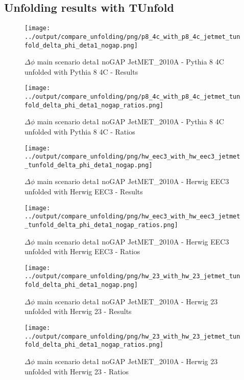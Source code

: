 \documentclass[11pt]{book}
\begin{document}
\clearpage
\subsection{Unfolding results with TUnfold}

\begin{figure}[ht]
\centering
\texttt{[image: ../output/compare\_unfolding/png/p8\_4c\_with\_p8\_4c\_jetmet\_tunfold\_delta\_phi\_deta1\_nogap.png]}
\caption{$\Delta\phi$ main scenario deta1 noGAP JetMET\_2010A - Pythia 8 4C unfolded with Pythia 8 4C - Results}
\label{p8_p8_jetmet_tunfold_delta_phi_deta1_nogap_a}
\end{figure}

\begin{figure}[ht]
\centering
\texttt{[image: ../output/compare\_unfolding/png/p8\_4c\_with\_p8\_4c\_jetmet\_tunfold\_delta\_phi\_deta1\_nogap\_ratios.png]}
\caption{$\Delta\phi$ main scenario deta1 noGAP JetMET\_2010A - Pythia 8 4C unfolded with Pythia 8 4C - Ratios}
\label{p8_p8_jetmet_tunfold_delta_phi_deta1_nogap_b}
\end{figure}

\begin{figure}[ht]
\centering
\texttt{[image: ../output/compare\_unfolding/png/hw\_eec3\_with\_hw\_eec3\_jetmet\_tunfold\_delta\_phi\_deta1\_nogap.png]}
\caption{$\Delta\phi$ main scenario deta1 noGAP JetMET\_2010A - Herwig EEC3 unfolded with Herwig EEC3 - Results}
\label{hw_eec3_hw_eec3_jetmet_tunfold_delta_phi_deta1_nogap_a}
\end{figure}

\begin{figure}[ht]
\centering
\texttt{[image: ../output/compare\_unfolding/png/hw\_eec3\_with\_hw\_eec3\_jetmet\_tunfold\_delta\_phi\_deta1\_nogap\_ratios.png]}
\caption{$\Delta\phi$ main scenario deta1 noGAP JetMET\_2010A - Herwig EEC3 unfolded with Herwig EEC3 - Ratios}
\label{hw_eec3_hw_eec3_jetmet_tunfold_delta_phi_deta1_nogap_b}
\end{figure}

\begin{figure}[ht]
\centering
\texttt{[image: ../output/compare\_unfolding/png/hw\_23\_with\_hw\_23\_jetmet\_tunfold\_delta\_phi\_deta1\_nogap.png]}
\caption{$\Delta\phi$ main scenario deta1 noGAP JetMET\_2010A - Herwig 23 unfolded with Herwig 23 - Results}
\label{hw_23_hw_23_jetmet_tunfold_delta_phi_deta1_nogap_a}
\end{figure}

\begin{figure}[ht]
\centering
\texttt{[image: ../output/compare\_unfolding/png/hw\_23\_with\_hw\_23\_jetmet\_tunfold\_delta\_phi\_deta1\_nogap\_ratios.png]}
\caption{$\Delta\phi$ main scenario deta1 noGAP JetMET\_2010A - Herwig 23 unfolded with Herwig 23 - Ratios}
\label{hw_23_hw_23_jetmet_tunfold_delta_phi_deta1_nogap_b}
\end{figure}
\end{document}
